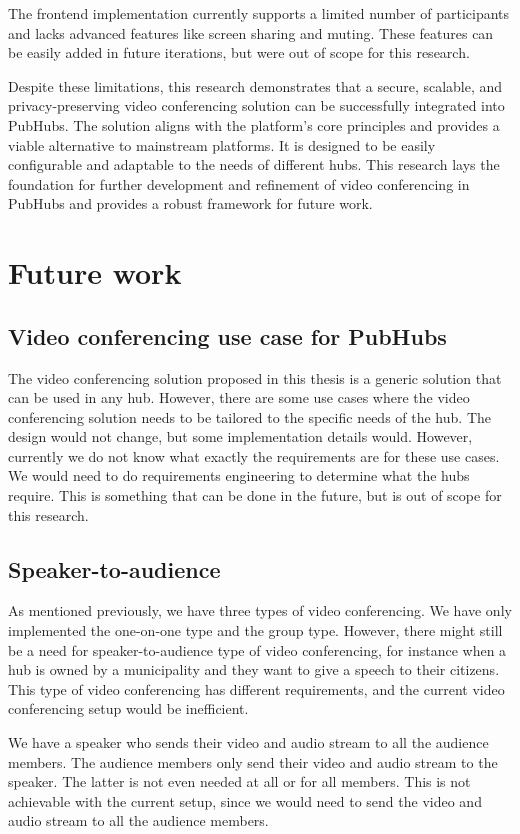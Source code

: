 \documentclass{report}
\begin{document}
The frontend implementation currently supports a limited number of participants and lacks advanced features like
screen sharing and muting. These features can be easily added in future iterations, but were out of scope for this
research.

Despite these limitations, this research demonstrates that a secure, scalable, and privacy-preserving video
conferencing solution can be successfully integrated into PubHubs. The solution aligns with the platform’s core
principles and provides a viable alternative to mainstream platforms. It is designed to be easily configurable and
adaptable to the needs of different hubs. This research lays the foundation for further development and refinement
of video conferencing in PubHubs and provides a robust framework for future work.

\chapter{Future work}
\section{Video conferencing use case for PubHubs}
The video conferencing solution proposed in this thesis is a generic solution that can be used in any hub. However,
there are some use cases where the video conferencing solution needs to be tailored to the specific needs of the hub.
The design would not change, but some implementation details would. However, currently we do not know what exactly the
requirements are for these use cases. We would need to do requirements engineering to determine what the hubs require.
This is something that can be done in the future, but is out of scope for this research.

\section{Speaker-to-audience}
As mentioned previously, we have three types of video conferencing. We have only implemented the one-on-one type and
the group type. However, there might still be a need for speaker-to-audience type of video conferencing, for instance
when a hub is owned by a municipality and they want to give a speech to their citizens. This type of video conferencing
has different requirements, and the current video conferencing setup would be inefficient.

We have a speaker who sends their video and audio stream to all the audience members. The audience members only send
their video and audio stream to the speaker. The latter is not even needed at all or for all members. This is not
achievable with the current setup, since we would need to send the video and audio stream to all the audience members.
\end{document}
